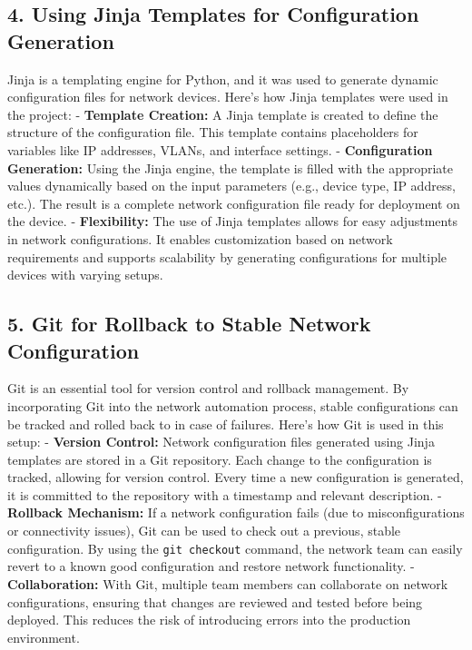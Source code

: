 \documentclass[11pt]{article}
\begin{document}
\hypertarget{using-jinja-templates-for-configuration-generation}{%
\subsection{4. Using Jinja Templates for Configuration
Generation}\label{using-jinja-templates-for-configuration-generation}}

Jinja is a templating engine for Python, and it was used to generate
dynamic configuration files for network devices. Here's how Jinja
templates were used in the project: - \textbf{Template Creation:} A
Jinja template is created to define the structure of the configuration
file. This template contains placeholders for variables like IP
addresses, VLANs, and interface settings. - \textbf{Configuration
Generation:} Using the Jinja engine, the template is filled with the
appropriate values dynamically based on the input parameters (e.g.,
device type, IP address, etc.). The result is a complete network
configuration file ready for deployment on the device. -
\textbf{Flexibility:} The use of Jinja templates allows for easy
adjustments in network configurations. It enables customization based on
network requirements and supports scalability by generating
configurations for multiple devices with varying setups.

\hypertarget{git-for-rollback-to-stable-network-configuration}{%
\subsection{5. Git for Rollback to Stable Network
Configuration}\label{git-for-rollback-to-stable-network-configuration}}

Git is an essential tool for version control and rollback management. By
incorporating Git into the network automation process, stable
configurations can be tracked and rolled back to in case of failures.
Here's how Git is used in this setup: - \textbf{Version Control:}
Network configuration files generated using Jinja templates are stored
in a Git repository. Each change to the configuration is tracked,
allowing for version control. Every time a new configuration is
generated, it is committed to the repository with a timestamp and
relevant description. - \textbf{Rollback Mechanism:} If a network
configuration fails (due to misconfigurations or connectivity issues),
Git can be used to check out a previous, stable configuration. By using
the \texttt{git\ checkout} command, the network team can easily revert
to a known good configuration and restore network functionality. -
\textbf{Collaboration:} With Git, multiple team members can collaborate
on network configurations, ensuring that changes are reviewed and tested
before being deployed. This reduces the risk of introducing errors into
the production environment.
\end{document}
